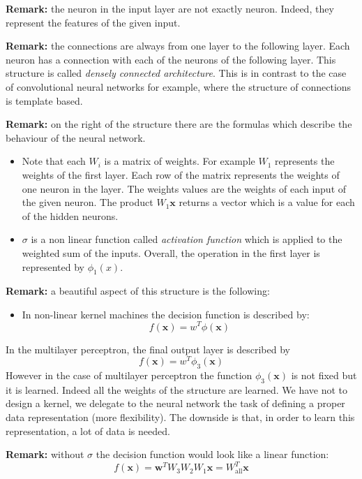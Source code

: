 \textbf{Remark:} the neuron in the input layer are not exactly neuron. Indeed,
they represent the features of the given input.
\newline

\textbf{Remark:} the connections are always from one layer to the following layer.
Each neuron has a connection with each of the neurons of the following layer. This
structure is called \textit{densely connected architecture}. This is in contrast
to the case of convolutional neural networks for example, where the structure of
connections is template based.
\newline

\textbf{Remark:} on the right of the structure there are the formulas which describe
the behaviour of the neural network.
\begin{itemize}
	\item Note that each $W_{i}$ is a matrix of weights. For example $W_{1}$
		represents the weights of the first layer. Each row of the matrix represents
		the weights of one neuron in the layer. The weights values are the weights
		of each input of the given neuron. The product $W_{1}\pmb{x}$ returns a vector
		which is a value for each of the hidden neurons.

	\item $\sigma$ is a non linear function called \textit{activation function}
		which is applied to the weighted sum of the inputs. Overall, the operation
		in the first layer is represented by $\phi_{1}(x)$.
\end{itemize}

\textbf{Remark:} a beautiful aspect of this structure is the following:
\begin{itemize}
	\item In non-linear kernel machines the decision function is described by:
		\[
			f(\pmb{x}) = w^{T}\phi(\pmb{x})
		\]
\end{itemize}
In the multilayer perceptron, the final output layer is described by
\[
	f(\pmb{x}) = w^{T}\phi_{3}(\pmb{x})
\]
However in the case of multilayer perceptron the function $\phi_{3}(\pmb{x})$ is
not fixed but it is learned. Indeed all the weights of the structure are learned.
We have not to design a kernel, we delegate to the neural network the task of defining
a proper data representation (more flexibility). The downside is that, in order to
learn this representation, a lot of data is needed.
\newline

\textbf{Remark:} without $\sigma$ the decision function would look like a linear
function:
\[
	f(\pmb{x}) = \pmb{w}^{T}W_{3}W_{2}W_{1}\pmb{x}= W_{\text{all}}^{T}\pmb{x}
\]

